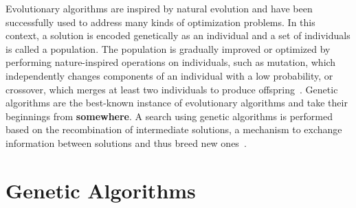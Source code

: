 \documentclass[paper=a4,%
  twoside,%
  BCOR4mm,%
  abstract=true,%
  toc=bibliography,%
  chapterprefix=true,%
  toc=bibliographynumbered,%
  open=right,%
  english,%
  pagesize=pdftex]{scrreprt}
\begin{document}
Evolutionary algorithms are inspired by natural evolution and have been successfully used to address many kinds of optimization problems. In this context, a solution is encoded genetically as an individual and a set of individuals is called a population. The population is gradually improved or optimized by performing nature-inspired operations on individuals, such as mutation, which independently changes components of an individual with a low probability, or crossover, which merges at least two individuals to produce offspring~\cite{Campos2017a}. Genetic algorithms are the best-known instance of evolutionary algorithms and take their beginnings from \textbf{somewhere}. A search using genetic algorithms is performed based on the recombination of intermediate solutions, a mechanism to exchange information between solutions and thus breed new ones~\cite{McMinn_2004}.

\section{Genetic Algorithms}
\end{document}
